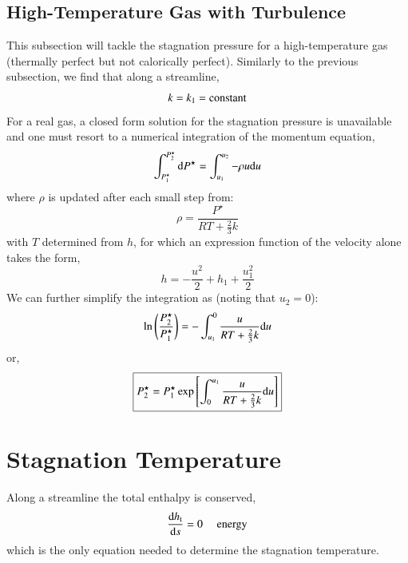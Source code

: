 \documentclass{warpdoc}
\numberwithin{equation}{section}
\newcommand{\mfd}{\displaystyle}
\newcommand{\ordi}{{\rm d}}
\newcommand{\bigfrac}{\mfd\frac}
\newcommand\frameeqn[1]{\fbox{$#1$}}
\begin{document}
\subsection{High-Temperature Gas with Turbulence}

This subsection will tackle the stagnation pressure for a high-temperature
gas (thermally perfect but not calorically perfect).
Similarly to the previous subsection, we find that along a streamline,
%
\begin{equation}
  k=k_1={\rm constant}
\end{equation}
%
For a real gas, a closed form solution for the stagnation pressure is unavailable
and one must resort to a numerical integration of the momentum equation,
%
\begin{equation}
 \int_{P^\star_1}^{P^\star_2}  \ordi P^\star
  =\int_{u_1}^{u_2}  -\rho u \ordi u
\end{equation}
%
where $\rho$ is updated after each small step from:
%
\begin{equation}
  \rho=\frac{P^\star}{R T+\frac{2}{3}k}
\end{equation}
%
with $T$ determined from $h$, for which an expression
function of the velocity alone takes the form,
%
\begin{equation}
  h= - \bigfrac{u^2}{2} + h_1 + \bigfrac{u_1^2}{2}
\end{equation}
%
We can further simplify the integration as (noting that $u_2=0$):
%
\begin{equation}
 \ln \left( \frac{P^\star_2}{P^\star_1}\right)
  =-\int_{u_1}^0  \frac{u}{R T+\frac{2}{3}k} \ordi u
\end{equation}
%
or,
%
\begin{equation}
 \frameeqn{
 \mfd P^\star_2
  =P^\star_1 \exp \left[ \int^{u_1}_0  \frac{u}{R T+\frac{2}{3}k} \ordi u \right]
 }
\end{equation}
%



\section{Stagnation Temperature}


Along a streamline the total enthalpy is conserved,
%
\begin{displaymath}
 \begin{array}{c@{~~~~~}l}
  \bigfrac{\ordi h_{\rm t}}{\ordi s} =0 & {\rm energy}
 \end{array}
\end{displaymath}
%
which is the only equation needed to determine the stagnation temperature.
\end{document}
